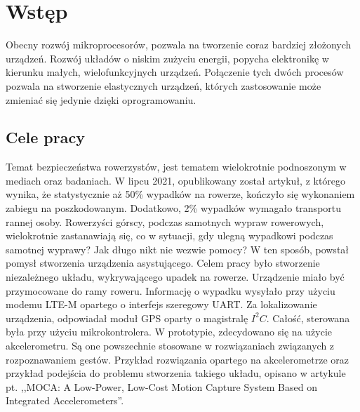 \chapter{Wstęp}
\label{cha:wstep}

Obecny rozwój mikroprocesorów, pozwala na tworzenie coraz bardziej złożonych urządzeń. Rozwój układów o niskim zużyciu energii, popycha elektronikę w kierunku małych, wielofunkcyjnych urządzeń. Połączenie tych dwóch procesów pozwala na stworzenie elastycznych urządzeń, których zastosowanie może zmieniać się jedynie dzięki oprogramowaniu.


\section{Cele pracy}
\label{sec:celePracy}
Temat bezpieczeństwa rowerzystów, jest tematem wielokrotnie podnoszonym w mediach oraz badaniach. W lipcu 2021, opublikowany został artykuł, z którego wynika, że statystycznie aż 50\% wypadków na rowerze, kończyło się wykonaniem zabiegu na poszkodowanym. Dodatkowo, 2\% wypadków wymagało transportu rannej osoby.\cite{collisions}
Rowerzyści górscy, podczas samotnych wypraw rowerowych, wielokrotnie zastanawiają się, co w sytuacji, gdy ulegną wypadkowi podczas samotnej wyprawy?
Jak długo nikt nie wezwie pomocy? W ten sposób, powstał pomysł stworzenia urządzenia asystującego.
\newline
Celem pracy było stworzenie niezależnego układu, wykrywającego upadek na rowerze. Urządzenie miało być przymocowane do ramy roweru. Informację o wypadku wysyłało przy użyciu modemu LTE-M opartego o interfejs szeregowy UART. Za lokalizowanie urządzenia, odpowiadał moduł GPS oparty o magistralę $I^{2}C$. Całość, sterowana była przy użyciu mikrokontrolera. W prototypie, zdecydowano się na użycie akcelerometru. Są one powszechnie stosowane w rozwiązaniach związanych z rozpoznawaniem gestów. Przykład rozwiązania opartego na akcelerometrze oraz przykład podejścia do problemu stworzenia takiego układu, opisano w artykule pt. ,,MOCA: A Low-Power, Low-Cost Motion Capture System Based on Integrated Accelerometers''.\cite{moca_acc}

